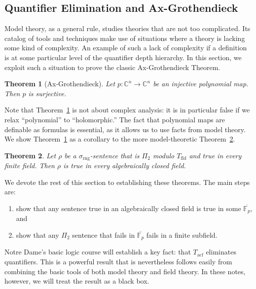 \documentclass{article}
\theoremstyle{plain}
\newtheorem{thm}{Theorem}[section]
\theoremstyle{definition}
\newcommand{\ringsig}{\sigma_{\operatorname{rng}}}
\newcommand{\fieldthy}{T_{\operatorname{fld}}}
\newcommand{\acf}{T_{\operatorname{acf}}}
\begin{document}
\subsection{Quantifier Elimination and Ax-Grothendieck}

Model theory, as a general rule, studies theories that are not too
complicated. Its catalog of tools and techniques make use of
situations where a theory is lacking some kind of complexity. An
example of such a lack of complexity if a definition is at some
particular level of the quantifier depth hierarchy. In this section,
we exploit such a situation to prove the classic Ax-Grothendieck
Theorem.

\begin{thm}[Ax-Grothendieck]\label{thm:ax-groth}
  Let $p : \mathbb{C}^n \to \mathbb{C}^n$ be an injective polynomial
  map. Then $p$ is surjective.
\end{thm}

Note that Theorem~\ref{thm:ax-groth} is not about complex analysis: it
is in particular false if we relax ``polynomial'' to ``holomorphic.''
The fact that polynomial maps are definable as formulas is essential,
as it allows us to use facts from model theory. We show
Theorem~\ref{thm:ax-groth} as a corollary to the more model-theoretic
Theorem~\ref{thm:ax-groth-modeltheory}.

\begin{thm}\label{thm:ax-groth-modeltheory}
  Let $\rho$ be a $\ringsig$-sentence that is $\Pi_2$ modulo
  $\fieldthy$ and true in every finite field. Then $\rho$ is true in
  every algebraically closed field.
\end{thm}

We devote the rest of this section to establishing these theorems. The
main steps are:
\begin{enumerate}
\item show that any sentence true in an algebraically closed field is
  true in some $\overline{\mathbb{F}_p}$, and
\item show that any $\Pi_2$ sentence that fails in
  $\overline{\mathbb{F}_p}$ fails in a finite subfield.
\end{enumerate}

Notre Dame's basic logic course will establish a key fact: that $\acf$
eliminates quantifiers. This is a powerful result that is nevertheless
follows easily from combining the basic tools of both model theory and
field theory. In these notes, however, we will treat the result as a
black box.
\end{document}

